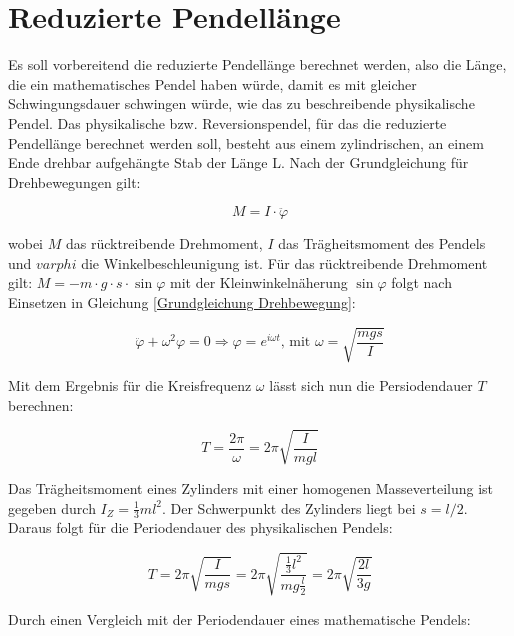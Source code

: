 \section{Reduzierte Pendellänge}

Es soll vorbereitend die reduzierte Pendellänge berechnet werden, also die Länge, die ein mathematisches Pendel haben würde, damit es mit gleicher Schwingungsdauer schwingen würde, wie das zu beschreibende physikalische Pendel. Das physikalische bzw. Reversionspendel, für das die reduzierte Pendellänge berechnet werden soll, besteht aus einem zylindrischen, an einem Ende drehbar aufgehängte Stab der Länge L.
Nach der Grundgleichung für Drehbewegungen gilt:

\begin{equation} \label{Grundgleichung Drehbewegung}
    M = I \cdot \ddot{\varphi}
\end{equation}

wobei $M$ das rücktreibende Drehmoment, $I$ das Trägheitsmoment des Pendels und $varphi$ die Winkelbeschleunigung ist. Für das rücktreibende Drehmoment gilt: $M = -m \cdot g \cdot s \cdot \sin{\varphi}$ mit der Kleinwinkelnäherung $\sin{\varphi}$ folgt nach Einsetzen in Gleichung \ref{Grundgleichung Drehbewegung}:

\begin{equation} \label{Schwingungsgleichung eines physikalischen Pendels}
\ddot{\varphi} + \omega^2\varphi = 0
\Rightarrow \varphi = e^{i \omega t} \text{, mit } \omega = \sqrt{\frac{mgs}{I}}
\end{equation}

Mit dem Ergebnis für die Kreisfrequenz $\omega$ lässt sich nun die Persiodendauer $T$ berechnen:

\begin{equation}
    T = \frac{2\pi}{\omega} = 2 \pi \sqrt{\frac{I}{mgl}}
\end{equation}

Das Trägheitsmoment eines Zylinders mit einer homogenen Masseverteilung ist gegeben durch $I_Z = \frac{1}{3} ml^2$. Der Schwerpunkt des Zylinders liegt bei $s = l/2$. Daraus folgt für die Periodendauer des physikalischen Pendels:

\begin{equation}
    T = 2 \pi \sqrt{\frac{I}{mgs}} = 2 \pi \sqrt{\frac{\frac{1}{3} l^2}{mg\frac{l}{2}}} = 2 \pi \sqrt{\frac{2l}{3g}}
\end{equation}

Durch einen Vergleich mit der Periodendauer eines mathematische Pendels:

